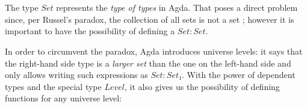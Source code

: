 {\begin{code}%
\>[0]\AgdaSpace{}%
\AgdaSpace{}%
\AgdaSymbol{(}\AgdaSpace{}%
\AgdaSymbol{:}\AgdaSpace{}%
\AgdaSymbol{)}\AgdaSpace{}%
\AgdaSymbol{:}\AgdaSpace{}%
\AgdaSpace{}%
\AgdaSpace{}%
\AgdaSpace{}%
\<%
\\
\>[0][@{}l@{\AgdaIndent{0}}]%
\>[2]\AgdaInductiveConstructor{[]}%
\>[6]\AgdaSymbol{:}\AgdaSpace{}%
\AgdaSpace{}%
\AgdaSpace{}%
\<%
\\
%
\>[2]\AgdaSpace{}%
\AgdaSymbol{:}\AgdaSpace{}%
\AgdaSymbol{\{}\AgdaSpace{}%
\AgdaSymbol{:}\AgdaSpace{}%
\AgdaSymbol{\}}\AgdaSpace{}%
\AgdaSpace{}%
\AgdaSpace{}%
\AgdaSpace{}%
\AgdaSpace{}%
\AgdaSpace{}%
\AgdaSpace{}%
\AgdaSpace{}%
\AgdaSpace{}%
\AgdaSpace{}%
\AgdaSymbol{(}\AgdaSpace{}%
\AgdaSymbol{)}\<%
\end{code}

The type $Set$ represents the \emph{type of types} in Agda. That poses a direct problem since, per Russel's paradox, the collection of all sets is not a set \cite{2019Official2.5.4.2}; however it is important to have the possibility of defining a $Set : Set$.

In order to circumvent the paradox, Agda introduces universe levels: it says that the right-hand side type is a \emph{larger set} than the one on the left-hand side and only allows writing such expressions as $Set : Set₁$. With the power of dependent types and the special type $Level$, it also gives us the possibility of defining functions for any universe level:

}
